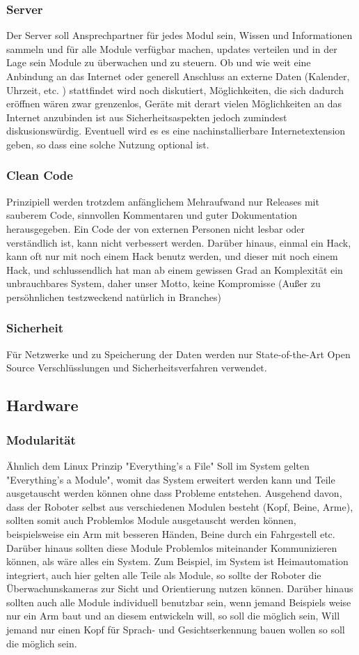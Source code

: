 \documentclass[11pt]{amsart}
\begin{document}
\subsubsection{Server}
Der Server soll Ansprechpartner f\"ur jedes Modul sein, Wissen und Informationen sammeln und f\"ur alle Module verf\"ugbar machen, updates verteilen und in der Lage sein Module zu \"uberwachen und zu steuern. Ob und wie weit eine Anbindung an das Internet oder generell Anschluss an externe Daten (Kalender, Uhrzeit, etc. ) stattfindet wird noch diskutiert, M\"oglichkeiten, die sich dadurch er\"offnen w\"aren zwar grenzenlos, Ger\"ate mit derart vielen M\"oglichkeiten an das Internet anzubinden ist aus Sicherheitsaspekten jedoch zumindest diskusionsw\"urdig. Eventuell wird es es eine nachinstallierbare Internetextension geben, so dass eine solche Nutzung optional ist. 
\subsubsection{Clean Code}
Prinzipiell werden trotzdem anf\"anglichem Mehraufwand nur Releases mit sauberem Code, sinnvollen Kommentaren und guter Dokumentation herausgegeben. Ein Code der von externen Personen nicht lesbar oder verst\"andlich ist, kann nicht verbessert werden. Dar\"uber hinaus, einmal ein Hack, kann oft nur mit noch einem Hack benutz werden, und dieser mit noch einem Hack, und schlussendlich hat man ab einem gewissen Grad an Komplexit\"at ein unbrauchbares System, daher unser Motto, keine Kompromisse (Au\ss{}er zu pers\"ohnlichen testzweckend nat\"urlich in Branches)
\subsubsection{Sicherheit}
F\"ur Netzwerke und zu Speicherung der Daten werden nur State-of-the-Art Open Source Verschl\"usslungen und Sicherheitsverfahren verwendet.

\subsection{Hardware}
\subsubsection{Modularit\"at}
\"Ahnlich dem Linux Prinzip "Everything's a File" Soll im System gelten "Everything's a Module", womit das System erweitert werden kann und Teile ausgetauscht werden k\"onnen ohne dass Probleme entstehen. Ausgehend davon, dass der Roboter selbst aus verschiedenen Modulen besteht (Kopf, Beine, Arme), sollten somit auch Problemlos Module ausgetauscht werden k\"onnen, beispielsweise ein Arm mit besseren H\"anden, Beine durch ein Fahrgestell etc. Dar\"uber hinaus sollten diese Module Problemlos miteinander Kommunizieren k\"onnen, als w\"are alles ein System. Zum Beispiel, im System ist Heimautomation integriert, auch hier gelten alle Teile als Module, so sollte der Roboter die \"Uberwachunskameras zur Sicht und Orientierung nutzen k\"onnen. Dar\"uber hinaus sollten auch alle Module individuell benutzbar sein, wenn jemand Beispiels weise nur ein Arm baut und an diesem entwickeln will, so soll die m\"oglich sein, Will jemand nur einen Kopf f\"ur Sprach- und Gesichtserkennung bauen wollen so soll die m\"oglich sein. 
\end{document}
